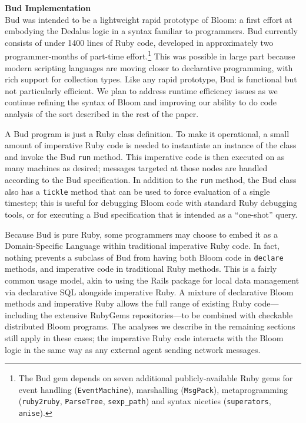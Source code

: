 {\bf Bud Implementation}\\
Bud was intended to be a lightweight rapid prototype of Bloom: a first effort at embodying the Dedalus logic in a syntax familiar to programmers.  Bud currently consists of under 1400 lines of Ruby code, developed in approximately two programmer-months of part-time effort.\footnote{The Bud gem depends on seven additional publicly-available Ruby gems for event handling (\texttt{EventMachine}), marshalling (\texttt{MsgPack}), metaprogramming (\texttt{ruby2ruby}, \texttt{ParseTree}, \texttt{sexp\_path}) and syntax niceties (\texttt{superators}, \texttt{anise}).}  This was possible in large part because modern scripting languages are moving closer to declarative programming, with rich support for collection types.  Like any rapid prototype, Bud is functional but not particularly efficient.  We plan to address runtime efficiency issues as we continue refining the syntax of Bloom and improving our ability to do code analysis of the sort described in the rest of the paper.

A Bud program is just a Ruby class definition.  To make it operational, a small amount of imperative Ruby code is needed to instantiate an instance of the class and invoke the Bud \texttt{run} method.  This imperative code is then executed on as many machines as desired; messages targeted at those nodes are handled according to the Bud specification.  In addition to the \texttt{run} method, the Bud class also has a \texttt{tickle} method that can be used to force evaluation of a single timestep; this is useful for debugging Bloom code with standard Ruby debugging tools, or for executing a Bud specification that is intended as a ``one-shot'' query.

Because Bud is pure Ruby, some programmers may choose to embed it as a Domain-Specific Language within traditional imperative Ruby code.  In fact, nothing prevents a subclass of Bud from having both Bloom code in \texttt{declare} methods, and imperative code in traditional Ruby methods.  This is a fairly common usage model, akin to using the Rails package for local data management via declarative SQL alongside imperative Ruby. A mixture of declarative Bloom methods and imperative Ruby allows the full range of existing Ruby code---including the extensive RubyGems repositories---to be combined with checkable distributed Bloom programs. The analyses we describe in the remaining sections still apply in these cases; the imperative Ruby code interacts with the Bloom logic in the same way as any external agent sending network messages.